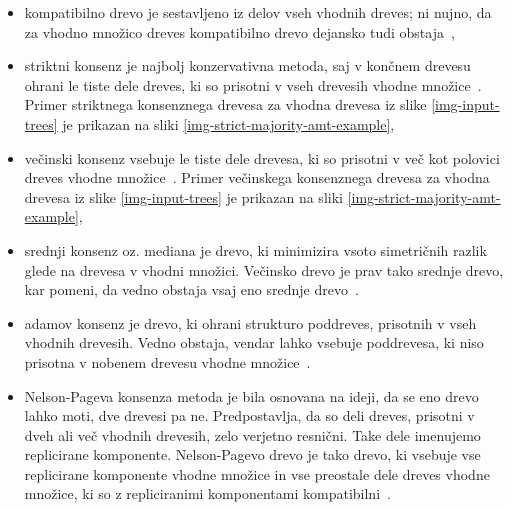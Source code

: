 \documentclass[a4paper, 12pt]{book}
\begin{document}
\begin{itemize}
	\item kompatibilno drevo je sestavljeno iz delov vseh vhodnih dreves; ni nujno, da za vhodno množico 
	      dreves kompatibilno drevo dejansko tudi obstaja~\cite{pw},
	
	\item striktni konsenz je najbolj konzervativna metoda, saj v končnem drevesu ohrani le
	      tiste dele dreves, ki so prisotni v vseh drevesih vhodne množice~\cite{bw}. 
	      Primer striktnega konsenznega drevesa za vhodna drevesa iz slike \ref{img-input-trees} 
	      je prikazan na sliki \ref{img-strict-majority-amt-example},
	
	\item večinski konsenz vsebuje le tiste dele drevesa, ki so prisotni v več kot polovici 
	      dreves vhodne množice~\cite{bw}. Primer večinskega konsenznega drevesa za vhodna 
	      drevesa iz slike \ref{img-input-trees} je prikazan na sliki 
	      \ref{img-strict-majority-amt-example},
	
	\item srednji konsenz oz. mediana je drevo, ki minimizira vsoto simetričnih razlik glede na 
	      drevesa v vhodni množici. Večinsko drevo je prav tako srednje drevo, kar pomeni, da 
	      vedno obstaja vsaj eno srednje drevo~\cite{pw}.
	
	\item adamov konsenz je drevo, ki ohrani strukturo poddreves, prisotnih v vseh vhodnih drevesih. 
	      Vedno obstaja, vendar lahko vsebuje poddrevesa, ki niso prisotna v nobenem drevesu vhodne
	      množice~\cite{classification}.
	      
	\item Nelson-Pageva konsenza metoda je bila osnovana na ideji, da se eno drevo lahko moti, dve
	      drevesi pa ne. Predpostavlja, da so deli dreves, prisotni v dveh ali več vhodnih drevesih,  
	      zelo verjetno resnični. Take dele imenujemo replicirane komponente. Nelson-Pagevo drevo
	      je tako drevo, ki vsebuje vse replicirane komponente vhodne množice in vse preostale dele 
	      dreves vhodne množice, ki so z repliciranimi komponentami kompatibilni~\cite{classification}.  
\end{itemize}
\end{document}
